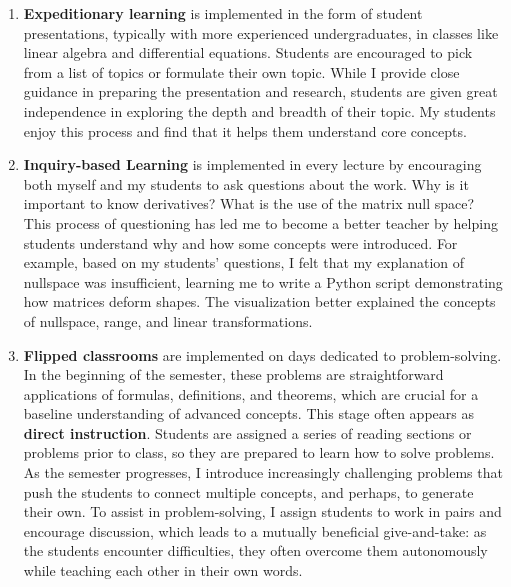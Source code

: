 \documentclass[a4paper,11pt]{article}
\begin{document}
	\begin{enumerate}
		\item \textbf{Expeditionary learning} is implemented in the form of student presentations, typically with more experienced undergraduates, in classes like linear algebra and differential equations. Students are encouraged to pick from a list of topics or formulate their own topic. While I provide close guidance in preparing the presentation and research, students are given great independence in exploring the depth and breadth of their topic. My students enjoy this process and find that it helps them understand core concepts.
		
		\item \textbf{Inquiry-based Learning} is implemented in every lecture by encouraging both myself and my students to ask questions about the work. Why is it important to know derivatives? What is the use of the matrix null space? This process of questioning has led me to become a better teacher by helping students understand why and how some concepts were introduced. For example, based on my students' questions, I felt that my explanation of nullspace was insufficient, learning me to write a Python script demonstrating how matrices deform shapes. The visualization better explained the concepts of nullspace, range, and linear transformations. %
		
		\item \textbf{Flipped classrooms} are implemented on days dedicated to problem-solving. In the beginning of the semester, these problems are straightforward applications of formulas, definitions, and theorems, which are crucial for a baseline understanding of advanced concepts. This stage often appears as \textbf{direct instruction}. Students are assigned a series of reading sections or problems prior to class, so they are prepared to learn how to solve problems. As the semester progresses, I introduce increasingly challenging problems that push the students to connect multiple concepts, and perhaps, to generate their own. To assist in problem-solving, I assign students to work in pairs and encourage discussion, which leads to a mutually beneficial give-and-take: as the students encounter difficulties, they often overcome them autonomously while teaching each other in their own words. %
		

\end{enumerate}
\end{document}
